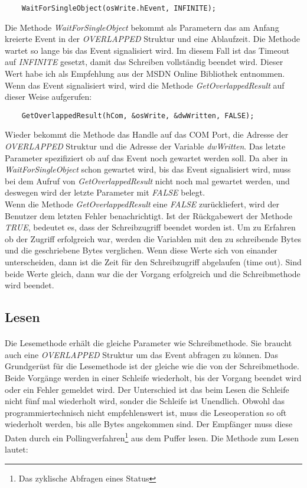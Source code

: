 \begin{lstlisting}
	WaitForSingleObject(osWrite.hEvent, INFINITE);
\end{lstlisting}

Die Methode \textit{WaitForSingleObject} bekommt als Parametern das am Anfang kreierte Event in der \textit{OVERLAPPED} Struktur und eine Ablaufzeit. Die Methode wartet so lange bis das Event signalisiert wird. Im diesem Fall ist das Timeout auf \textit{INFINITE} gesetzt, damit das Schreiben vollständig beendet wird. Dieser Wert habe ich als Empfehlung aus der MSDN Online Bibliothek\cite{SerialCommunications} entnommen. Wenn das Event signalisiert wird, wird die Methode \textit{GetOverlappedResult} auf dieser Weise aufgerufen:

\begin{lstlisting}
	GetOverlappedResult(hCom, &osWrite, &dwWritten, FALSE);
\end{lstlisting}

Wieder bekommt die Methode das Handle auf das COM Port, die Adresse der \textit{OVERLAPPED} Struktur und die Adresse der Variable \textit{dwWritten}. Das letzte Parameter spezifiziert ob auf das Event noch gewartet werden soll. Da aber in \textit{WaitForSingleObject} schon gewartet wird, bis das Event signalisiert wird, muss bei dem Aufruf von \textit{GetOverlappedResult} nicht noch mal gewartet werden, und deswegen wird der letzte Parameter mit \textit{FALSE} belegt.\\

Wenn die Methode \textit{GetOverlappedResult} eine \textit{FALSE} zurückliefert, wird der Benutzer dem letzten Fehler benachrichtigt. Ist der Rückgabewert der Methode \textit{TRUE}, bedeutet es, dass der Schreibzugriff beendet worden ist. Um zu Erfahren ob der Zugriff erfolgreich war, werden die Variablen mit den zu schreibende Bytes und die geschriebene Bytes verglichen. Wenn diese Werte sich von einander unterscheiden, dann ist die Zeit für den Schreibzugriff abgelaufen (time out). Sind beide Werte gleich, dann war die der Vorgang erfolgreich und die Schreibmethode wird beendet.


\subsection{Lesen}
\paragraph{}
Die Lesemethode erhält die gleiche Parameter wie Schreibmethode. Sie braucht auch eine \textit{OVERLAPPED} Struktur um das Event abfragen zu können. Das Grundgerüst für die Lesemethode ist der gleiche wie die von der Schreibmethode. Beide Vorgänge werden in einer Schleife wiederholt, bis der Vorgang beendet wird oder ein Fehler gemeldet wird. Der Unterschied ist das beim Lesen die Schleife nicht fünf mal wiederholt wird, sonder die Schleife ist Unendlich. Obwohl das programmiertechnisch nicht empfehlenswert ist, muss die Leseoperation so oft wiederholt werden, bis alle Bytes angekommen sind. Der Empfänger muss diese Daten durch ein Pollingverfahren\footnote{Das zyklische Abfragen eines Status} aus dem Puffer lesen. Die Methode zum Lesen lautet:

